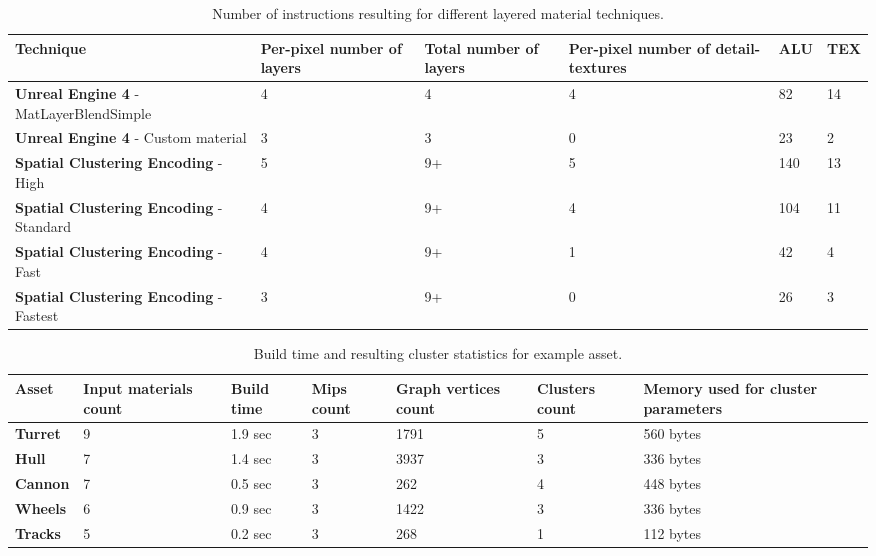 \begin {table}
\begin{center}
    \begin{tabularx}{1\textwidth}{ | p{3.5cm} | X | X | X | X | X | }
    \hline
    Technique & Per-pixel number of layers & Total number of layers & Per-pixel number of detail-textures & ALU & TEX \\ \hline
    \textbf{Unreal Engine 4} - MatLayerBlendSimple & 4 & 4 & 4 & 82 & 14 \\ \hline
    \textbf{Unreal Engine 4} - Custom material & 3 & 3 & 0 & 23 & 2 \\ \hline
    \textbf{Spatial Clustering Encoding} - High & 5 & 9+ & 5 & 140 & 13 \\ \hline
    \textbf{Spatial Clustering Encoding} - Standard & 4 & 9+ & 4 & 104 & 11 \\ \hline
    \textbf{Spatial Clustering Encoding} - Fast & 4 & 9+ & 1 & 42 & 4 \\ \hline
    \textbf{Spatial Clustering Encoding} - Fastest & 3 & 9+ & 0 & 26 & 3 \\ \hline
    \end{tabularx}
\end{center}
\vspace*{-5mm}
\caption {Number of instructions resulting for different layered material techniques.} \label{Makeev-PerfTable}
\end {table}


\begin {table}
\begin{center}
    \begin{tabularx}{\textwidth}{ | X | X | X | X | X | X | X |}
    \hline
    Asset & Input materials count & Build time & Mips count & Graph vertices count & Clusters count & Memory used for cluster parameters \\ \hline
    \textbf{Turret} & 9 & 1.9 sec & 3 & 1791 & 5 & 560 bytes \\ \hline
    \textbf{Hull} & 7 & 1.4 sec & 3 & 3937 & 3 & 336 bytes \\ \hline
    \textbf{Cannon} & 7 & 0.5 sec & 3 & 262 & 4 & 448 bytes \\ \hline
    \textbf{Wheels} & 6 & 0.9 sec & 3 & 1422 & 3 & 336 bytes \\ \hline
    \textbf{Tracks} & 5 & 0.2 sec & 3 & 268 & 1 & 112 bytes \\ \hline
    \end{tabularx}
\end{center}
\vspace*{-5mm}
\caption {Build time and resulting cluster statistics for example asset.} \label{Makeev-ResultsTable}
\end {table}

